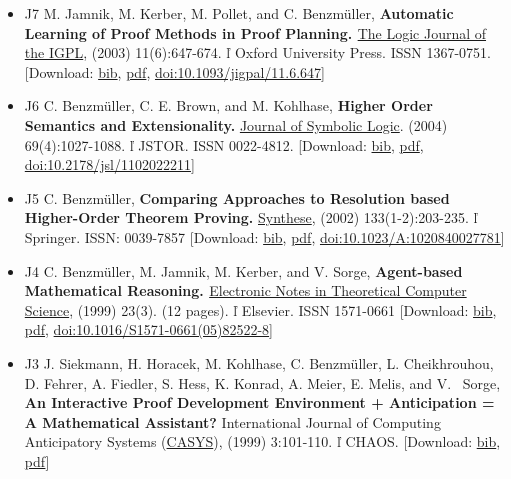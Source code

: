 \documentclass{article}
\newcommand{\tmtextbf}[1]{{\bfseries{#1}}}
\newenvironment{itemizedot}{\begin{itemize} \renewcommand{\labelitemi}{$\bullet$}\renewcommand{\labelitemii}{$\bullet$}\renewcommand{\labelitemiii}{$\bullet$}\renewcommand{\labelitemiv}{$\bullet$}}{\end{itemize}}
\begin{document}
{{\begin{itemizedot}
  \item [J7] {\small M. Jamnik, M. Kerber, M. Pollet, and C. Benzm\"uller,
  \tmtextbf{Automatic Learning of Proof Methods in Proof Planning.
  }\href{http://www3.oup.co.uk/igpl/}{The Logic Journal of the IGPL}, (2003)
  11(6):647-674.  \v{l}  Oxford University Press.} ISSN 1367-0751.
  {\color{grey} [Download: {\small \href{../papers/J7.bib}{bib},
  \href{../papers/J7.pdf}{pdf}}, {\small
  \href{http://dx.doi.org/10.1093/jigpal/11.6.647}{doi:10.1093/jigpal/11.6.647}}]}
  
  \item [J6] {\small C. Benzm\"uller, C. E. Brown, and M. Kohlhase,
  \tmtextbf{Higher Order Semantics and Extensionality.}
  \href{http://www.jstor.org/journals/00224812.html}{Journal of Symbolic
  Logic}. (2004) 69(4):1027-1088.  \v{l}  JSTOR.} ISSN 0022-4812.{\color{grey}
  [Download: {\small \href{../papers/J6.bib}{bib},
  \href{../papers/J6.pdf}{pdf}}, {\small
  \href{http://dx.doi.org/10.2178/jsl/1102022211}{doi:10.2178/jsl/1102022211}}]}
  
  \item [J5] {\small C. Benzm\"uller, \tmtextbf{Comparing Approaches to
  Resolution based Higher-Order Theorem Proving.}
  \href{http://www.kluweronline.com/issn/0039-7857}{Synthese}, (2002)
  133(1-2):203-235.  \v{l}  Springer.} ISSN: 0039-7857 {\color{grey}
  [Download: {\small \href{../papers/J5.bib}{bib},
  \href{../papers/J5.pdf}{pdf}}, {\small
  \href{http://dx.doi.org/10.1023/A:1020840027781}{doi:10.1023/A:1020840027781}}]}
  
  \item [J4] {\small C. Benzm\"uller, M. Jamnik, M. Kerber, and V. Sorge,
  \tmtextbf{Agent-based Mathematical Reasoning.
  }\href{http://www.elsevier.nl/gej-ng/31/29/23/show/Products/notes/index.htt}{Electronic
  Notes in Theoretical Computer Science}, (1999) 23(3). (12 pages).  \v{l} 
  Elsevier.} ISSN 1571-0661 {\color{grey} [Download: {\small
  \href{../papers/J4.bib}{bib}, \href{../papers/J4.pdf}{pdf}}, {\small
  \href{http://dx.doi.org/10.1016/S1571-0661(05)82522-8}{doi:10.1016/S1571-0661(05)82522-8}}]}
  
  \item [J3] {\small J. Siekmann, H. Horacek, M. Kohlhase, C. Benzm\"uller, L.
  Cheikhrouhou, D. Fehrer, A. Fiedler, S. Hess, K. Konrad, A. Meier, E. Melis,
  and V. \ Sorge, \tmtextbf{An Interactive Proof Development Environment +
  Anticipation = A Mathematical Assistant?}} {\small International Journal of
  Computing Anticipatory Systems
  (\href{http://www.ulg.ac.be/mathgen/CHAOS/CASYS.html}{CASYS}), (1999)
  3:101-110.  \v{l}  CHAOS.} {\color{grey} [Download: {\small
  \href{../papers/J3.bib}{bib}, \href{../papers/J3.pdf}{pdf}}]}
  

\end{itemizedot}}}
\end{document}
